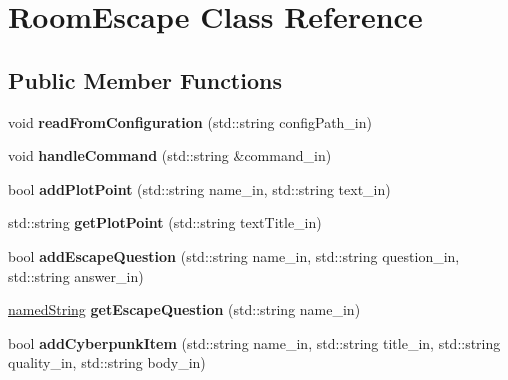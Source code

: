\hypertarget{class_room_escape}{}\section{Room\+Escape Class Reference}
\label{class_room_escape}
\subsection*{Public Member Functions}
\begin{DoxyCompactItemize}
\item 
\mbox{\label{class_room_escape_aac6211dbd39f662fbc4b769c5e6e8b87}} 
void {\bfseries read\+From\+Configuration} (std\+::string config\+Path\+\_\+in)
\item 
\mbox{\label{class_room_escape_ab3549a3d304b035d7c920fa9ec07b044}} 
void {\bfseries handle\+Command} (std\+::string \&command\+\_\+in)
\item 
\mbox{\label{class_room_escape_aed04dc0d2a946d364dca53eb81aa9c05}} 
bool {\bfseries add\+Plot\+Point} (std\+::string name\+\_\+in, std\+::string text\+\_\+in)
\item 
\mbox{\label{class_room_escape_a58cfa47f7e6c5540c9932d69c6f25e3d}} 
std\+::string {\bfseries get\+Plot\+Point} (std\+::string text\+Title\+\_\+in)
\item 
\mbox{\label{class_room_escape_a9eca42030b7f818da5ff37e6508065f5}} 
bool {\bfseries add\+Escape\+Question} (std\+::string name\+\_\+in, std\+::string question\+\_\+in, std\+::string answer\+\_\+in)
\item 
\mbox{\label{class_room_escape_a67af0e71775a2cc1fd982d71ec421cea}} 
\hyperlink{structnamed_string}{named\+String} {\bfseries get\+Escape\+Question} (std\+::string name\+\_\+in)
\item 
\mbox{\label{class_room_escape_a756c28aea5b9a3bdfd0293cd568e8d31}} 
bool {\bfseries add\+Cyberpunk\+Item} (std\+::string name\+\_\+in, std\+::string title\+\_\+in, std\+::string quality\+\_\+in, std\+::string body\+\_\+in)
\item 
\mbox{\label{class_room_escape_af4c678e7ca689d21e5d384e7fb1ebc74}} 

\end{DoxyCompactItemize}
